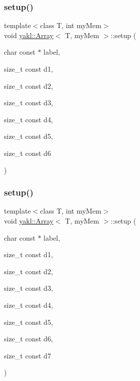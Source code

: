 \subsubsection{\texorpdfstring{setup()}{setup()}\hspace{0.1cm}{\footnotesize\ttfamily [6/8]}}
{\footnotesize\ttfamily template$<$class T, int my\+Mem$>$ \\
void \hyperlink{classyakl_1_1Array}{yakl\+::\+Array}$<$ T, my\+Mem $>$\+::setup (\begin{DoxyParamCaption}\item[{char const $\ast$}]{label,  }\item[{size\+\_\+t const}]{d1,  }\item[{size\+\_\+t const}]{d2,  }\item[{size\+\_\+t const}]{d3,  }\item[{size\+\_\+t const}]{d4,  }\item[{size\+\_\+t const}]{d5,  }\item[{size\+\_\+t const}]{d6 }\end{DoxyParamCaption})\hspace{0.3cm}{\ttfamily [inline]}}

\mbox{\label{classyakl_1_1Array_ab5f969be895579e32b5e506a70edd471}} 
\subsubsection{\texorpdfstring{setup()}{setup()}\hspace{0.1cm}{\footnotesize\ttfamily [7/8]}}
{\footnotesize\ttfamily template$<$class T, int my\+Mem$>$ \\
void \hyperlink{classyakl_1_1Array}{yakl\+::\+Array}$<$ T, my\+Mem $>$\+::setup (\begin{DoxyParamCaption}\item[{char const $\ast$}]{label,  }\item[{size\+\_\+t const}]{d1,  }\item[{size\+\_\+t const}]{d2,  }\item[{size\+\_\+t const}]{d3,  }\item[{size\+\_\+t const}]{d4,  }\item[{size\+\_\+t const}]{d5,  }\item[{size\+\_\+t const}]{d6,  }\item[{size\+\_\+t const}]{d7 }\end{DoxyParamCaption})\hspace{0.3cm}{\ttfamily [inline]}}

